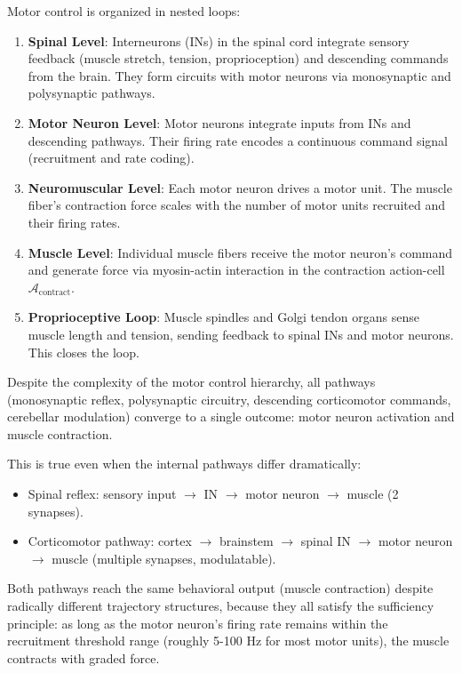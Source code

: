 \begin{definition}
\label{def:control-hierarchy}
Motor control is organized in nested loops:

\begin{enumerate}[label=(\Roman*), noitemsep]

\item \textbf{Spinal Level}: Interneurons (INs) in the spinal cord integrate sensory feedback (muscle stretch, tension, proprioception) and descending commands from the brain. They form circuits with motor neurons via monosynaptic and polysynaptic pathways.

\item \textbf{Motor Neuron Level}: Motor neurons integrate inputs from INs and descending pathways. Their firing rate encodes a continuous command signal (recruitment and rate coding).

\item \textbf{Neuromuscular Level}: Each motor neuron drives a motor unit. The muscle fiber's contraction force scales with the number of motor units recruited and their firing rates.

\item \textbf{Muscle Level}: Individual muscle fibers receive the motor neuron's command and generate force via myosin-actin interaction in the contraction action-cell $\mathcal{A}_{\text{contract}}$.

\item \textbf{Proprioceptive Loop}: Muscle spindles and Golgi tendon organs sense muscle length and tension, sending feedback to spinal INs and motor neurons. This closes the loop.

\end{enumerate}
\end{definition}

\begin{theorem}
\label{thm:hierarchical-sufficiency}
Despite the complexity of the motor control hierarchy, all pathways (monosynaptic reflex, polysynaptic circuitry, descending corticomotor commands, cerebellar modulation) converge to a single outcome: motor neuron activation and muscle contraction.

This is true even when the internal pathways differ dramatically:
\begin{itemize}[noitemsep]
\item Spinal reflex: sensory input $\to$ IN $\to$ motor neuron $\to$ muscle (2 synapses).
\item Corticomotor pathway: cortex $\to$ brainstem $\to$ spinal IN $\to$ motor neuron $\to$ muscle (multiple synapses, modulatable).
\end{itemize}

Both pathways reach the same behavioral output (muscle contraction) despite radically different trajectory structures, because they all satisfy the sufficiency principle: as long as the motor neuron's firing rate remains within the recruitment threshold range (roughly 5-100 Hz for most motor units), the muscle contracts with graded force.
\end{theorem}

